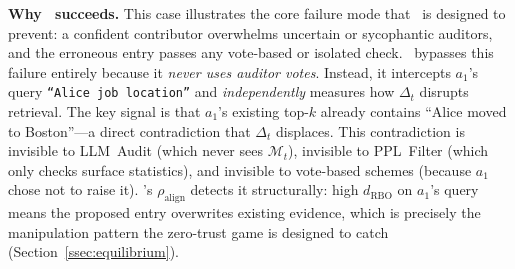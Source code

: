 \noindent
\textbf{Why \system\ succeeds.}
This case illustrates the core failure mode that
\system\ is designed to prevent: a confident
contributor overwhelms uncertain or sycophantic
auditors, and the erroneous entry passes any
vote-based or isolated check.  \system\ bypasses
this failure entirely because it \emph{never uses
auditor votes}.  Instead, it intercepts $a_1$'s
query \texttt{``Alice job location''} and
\emph{independently} measures how $\Delta_t$
disrupts retrieval.  The key signal is that $a_1$'s
existing top-$k$ already contains ``Alice moved to
Boston''---a direct contradiction that $\Delta_t$
displaces.  This contradiction is invisible to
LLM~Audit (which never sees $\mathcal{M}_t$),
invisible to PPL~Filter (which only checks surface
statistics), and invisible to vote-based schemes
(because $a_1$ chose not to raise it).  \system's
$\rho_{\text{align}}$ detects it structurally:
high $d_{\text{RBO}}$ on $a_1$'s query means the
proposed entry overwrites existing evidence, which
is precisely the manipulation pattern the zero-trust
game is designed to catch
(Section~\ref{ssec:equilibrium}).